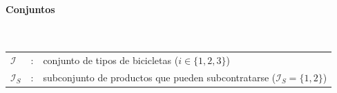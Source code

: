 

\paragraph{Conjuntos}\mbox{}\\
\begin{tabular}{lcl}
$\mathcal{I}$ & : & conjunto de tipos de bicicletas ($i \in \{1,2,3\}$) \\
$\mathcal{I}_S$ & : & subconjunto de productos que pueden subcontratarse ($\mathcal{I}_S = \{1,2\}$) \\
\end{tabular}

